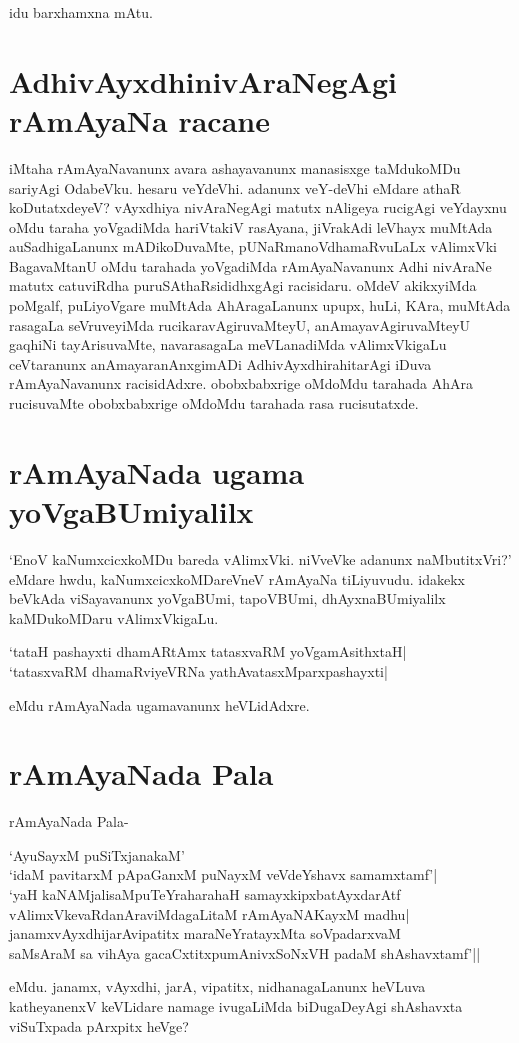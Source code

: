 idu barxhamxna mAtu.

\section*{AdhivAyxdhinivAraNegAgi rAmAyaNa racane}

iMtaha rAmAyaNavanunx avara ashayavanunx manasisxge taMdukoMDu sariyAgi OdabeVku. hesaru veYdeVhi. adanunx veY-deVhi eMdare athaR koDutatxdeyeV? vAyxdhiya nivAraNegAgi matutx nAligeya rucigAgi veYdayxnu oMdu taraha yoVgadiMda hariVtakiV rasAyana, jiVrakAdi leVhayx muMtAda auSadhigaLanunx mADikoDuvaMte, pUNaRmanoVdhamaRvuLaLx vAlimxVki BagavaMtanU oMdu tarahada yoVgadiMda rAmAyaNavanunx Adhi nivAraNe matutx catuviRdha puruSAthaRsididhxgAgi racisidaru. oMdeV akikxyiMda poMgalf, puLiyoVgare muMtAda AhAragaLanunx upupx, huLi, KAra, muMtAda rasagaLa seVruveyiMda rucikaravAgiruvaMteyU, anAmayavAgiruvaMteyU gaqhiNi tayArisuvaMte, navarasagaLa meVLanadiMda vAlimxVkigaLu ceVtaranunx anAmayaranAnxgimADi AdhivAyxdhirahitarAgi iDuva rAmAyaNavanunx racisidAdxre. obobxbabxrige oMdoMdu tarahada AhAra rucisuvaMte obobxbabxrige oMdoMdu tarahada rasa rucisutatxde.

\section*{rAmAyaNada ugama yoVgaBUmiyalilx}

`EnoV kaNumxcicxkoMDu bareda vAlimxVki. niVveVke adanunx naMbutitxVri?' eMdare hwdu,  kaNumxcicxkoMDareVneV rAmAyaNa tiLiyuvudu. idakekx  beVkAda viSayavanunx yoVgaBUmi, tapoVBUmi, dhAyxnaBUmiyalilx kaMDukoMDaru vAlimxVkigaLu. 

\begin{shloka}
`tataH pashayxti dhamARtAmx tatasxvaRM yoVgamAsithxtaH|\label{210a}\\
`tatasxvaRM dhamaRviyeVRNa yathAvatasxMparxpashayxti|\label{210c}
\end{shloka}
eMdu rAmAyaNada ugamavanunx heVLidAdxre.

\section*{rAmAyaNada Pala}

rAmAyaNada Pala-

\begin{shloka}
`AyuSayxM puSiTxjanakaM'\label{210}\\
`idaM pavitarxM pApaGanxM puNayxM veVdeYshavx samamxtamf'|\label{211h}\\
`yaH kaNAMjalisaMpuTeYraharahaH samayxkipxbatAyxdarAtf\label{211e}\\
vAlimxVkevaRdanAraviMdagaLitaM rAmAyaNAKayxM madhu|\\
janamxvAyxdhijarAvipatitx maraNeYratayxMta soVpadarxvaM\\
saMsAraM sa vihAya gacaCxtitxpumAnivxSoNxVH padaM shAshavxtamf'||
\end{shloka}
eMdu. janamx, vAyxdhi, jarA, vipatitx, nidhanagaLanunx heVLuva katheyanenxV keVLidare namage ivugaLiMda biDugaDeyAgi shAshavxta viSuTxpada pArxpitx heVge?

